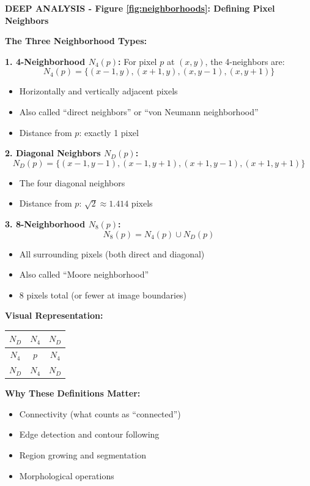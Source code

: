 \documentclass[12pt,a4paper]{article}
\begin{document}
\begin{deepexplanation}
\textbf{DEEP ANALYSIS - Figure \ref{fig:neighborhoods}: Defining Pixel Neighbors}

\textbf{The Three Neighborhood Types:}

\textbf{1. 4-Neighborhood $N_4(p)$:}
For pixel $p$ at $(x, y)$, the 4-neighbors are:
\[
N_4(p) = \{(x-1, y), (x+1, y), (x, y-1), (x, y+1)\}
\]
\begin{itemize}
    \item Horizontally and vertically adjacent pixels
    \item Also called ``direct neighbors'' or ``von Neumann neighborhood''
    \item Distance from $p$: exactly 1 pixel
\end{itemize}

\textbf{2. Diagonal Neighbors $N_D(p)$:}
\[
N_D(p) = \{(x-1, y-1), (x-1, y+1), (x+1, y-1), (x+1, y+1)\}
\]
\begin{itemize}
    \item The four diagonal neighbors
    \item Distance from $p$: $\sqrt{2} \approx 1.414$ pixels
\end{itemize}

\textbf{3. 8-Neighborhood $N_8(p)$:}
\[
N_8(p) = N_4(p) \cup N_D(p)
\]
\begin{itemize}
    \item All surrounding pixels (both direct and diagonal)
    \item Also called ``Moore neighborhood''
    \item 8 pixels total (or fewer at image boundaries)
\end{itemize}

\textbf{Visual Representation:}
\begin{center}
\begin{tabular}{|c|c|c|}
\hline
$N_D$ & $N_4$ & $N_D$ \\
\hline
$N_4$ & $p$ & $N_4$ \\
\hline
$N_D$ & $N_4$ & $N_D$ \\
\hline
\end{tabular}
\end{center}

\textbf{Why These Definitions Matter:}
\begin{itemize}
    \item Connectivity (what counts as ``connected'')
    \item Edge detection and contour following
    \item Region growing and segmentation
    \item Morphological operations
\end{itemize}
\end{deepexplanation}
\end{document}

